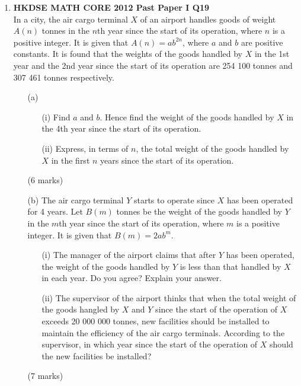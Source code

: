\documentclass[12pt]{article}
\begin{document}
\begin{enumerate}
	\item \textbf{HKDSE MATH CORE 2012 Past Paper I Q19}\\
	In a city, the air cargo terminal $X$ of an airport handles goods of weight $A(n)$ tonnes in the $n$th year since the start of its operation, where $n$ is a positive integer. It is given that $A(n) = ab^{2n}$, where $a$ and $b$ are positive constants. It is found that the weights of the goods handled by $X$ in the 1st year and the 2nd year since the start of its operation are 254 100 tonnes and 307 461 tonnes respectively.
	\begin{enumerate}
		\item[(a)]
		\begin{enumerate}
			\item[(i)] Find $a$ and $b$. Hence find the weight of the goods handled by $X$ in the 4th year since the start of its operation.
			\item[(ii)] Express, in terms of $n$, the total weight of the goods handled by $X$ in the first $n$ years since the start of its operation.
		\end{enumerate}
		(6 marks)
		\item[(b)] The air cargo terminal $Y$ starts to operate since $X$ has been operated for 4 years. Let $B(m)$ tonnes be the weight of the goods handled by $Y$ in the $m$th year since the start of its operation, where $m$ is a positive integer. It is given that $B(m) = 2ab^m$.
		\begin{enumerate}
			\item[(i)] The manager of the airport claims that after $Y$ has been operated, the weight of the goods handled by $Y$ is less than that handled by $X$ in each year. Do you agree? Explain your answer.
			\item[(ii)] The supervisor of the airport thinks that when the total weight of the goods hangled by $X$ and $Y$ since the start of the operation of $X$ exceeds 20 000 000 tonnes, new facilities should be installed to maintain the efficiency of the air cargo terminals. According to the supervisor, in which year since the start of the operation of $X$ should the new facilities be installed?
		\end{enumerate}
		(7 marks)
	\end{enumerate}


\end{enumerate}
\end{document}
